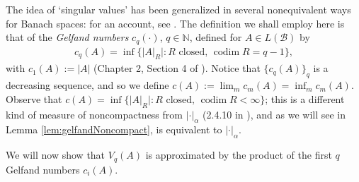 \documentclass[11pt]{amsart}
\theoremstyle{theorem}
\theoremstyle{definition}
\numberwithin{equation}{section}
\newcommand{\N}{\mathbb{N}}
\renewcommand{\a}{\alpha}
\newcommand{\Bc}{\mathcal{B}}
\newcommand{\codim}{\operatorname{codim}}
\begin{document}
The idea of `singular values' has been generalized in several nonequivalent ways for Banach spaces: for an account, see \cite{P}. The definition we shall employ here is that of the \emph{Gelfand numbers} $c_q(\cdot)$, $q \in \N$, defined for $A \in L(\Bc)$ by
\begin{align} \label{eq:gelfand}
c_q(A) = \inf\{|A|_R| : R \text{ closed, } \codim R = q-1\},
\end{align}
with $c_1(A) := |A|$ (Chapter 2, Section 4 of \cite{P}). Notice that $\{c_q(A)\}_q$ is a decreasing sequence, and so we define $c(A) := \lim_m c_m(A) = \inf_m c_m(A)$. Observe that $c(A) = \inf \{|A|_R| : R \text{ closed, } \codim R < \infty\}$; this is a different kind of measure of noncompactness from $|\cdot|_{\a}$ (2.4.10 in \cite{Akhmerov}), and as we will see in Lemma \ref{lem:gelfandNoncompact}, is equivalent to $|\cdot|_{\a}$.

We will now show that $V_q(A)$ is approximated by the product of the first $q$ Gelfand numbers $c_i(A)$.
\end{document}
